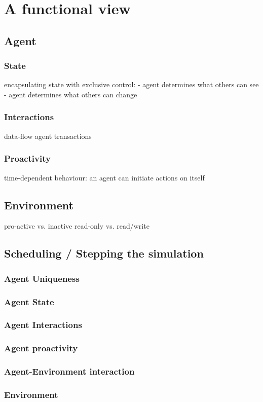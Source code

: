 \section{A functional view}
\subsection{Agent}

\subsubsection{State}
encapsulating state with exclusive control:
	- agent determines what others can see
	- agent determines what others can change
	
\subsubsection{Interactions}
data-flow
agent transactions

\subsubsection{Proactivity}
time-dependent behaviour: an agent can initiate actions on itself

\subsection{Environment}
pro-active vs. inactive
read-only vs. read/write

\subsection{Scheduling / Stepping the simulation}


\subsubsection{Agent Uniqueness}
\subsubsection{Agent State}
\subsubsection{Agent Interactions}
\subsubsection{Agent proactivity}
\subsubsection{Agent-Environment interaction}
\subsubsection{Environment}